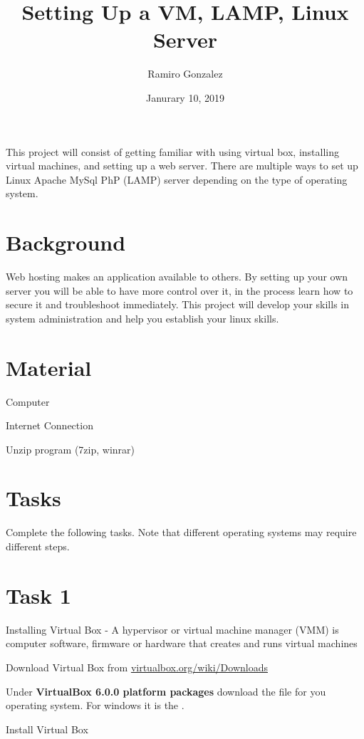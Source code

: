 \documentclass[12pt]{article}
\begin{document}
\title{ Setting Up a VM, LAMP, Linux Server}
\author{Ramiro Gonzalez}
\date{Janurary 10, 2019}

\maketitle

\begin{Objective}
	This project will consist of getting familiar with using virtual box, installing virtual machines, and setting up a web server.  There are multiple ways to set up Linux Apache MySql PhP (LAMP) server depending on the type of operating system. 
\end{Objective}

\section*{Background}
	Web hosting makes an application available to others.  By setting up your own server you will be able to have more control over it, in the process learn how to secure it and troubleshoot immediately. This project will develop your skills in system administration and help you establish your linux skills. 
\section*{Material}
 \color{black}
\begin{todolist}
    \item Computer 
    \item Internet Connection
    \item Unzip program (7zip, winrar) 
\end{todolist}
\section{Tasks}
Complete the following tasks. Note that different operating systems may require different steps. 
\section*{Task 1}
Installing Virtual Box - 
A hypervisor or virtual machine manager (VMM) is computer software, firmware or hardware that creates and runs virtual machines
\begin{todolist}
	  \item Download Virtual Box from \color{red} \href{https://www.virtualbox.org/wiki/Downloads}{virtualbox.org/wiki/Downloads}\color{black} 
	  \item Under \textbf{VirtualBox 6.0.0 platform packages} download the file for you operating system. For windows it is the . 
	  \item Install Virtual Box
\end{todolist}
\end{document}
